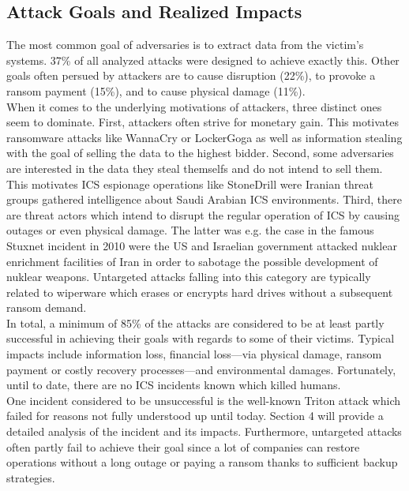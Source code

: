 \documentclass[runningheads]{llncs}
\begin{document}
\subsection{Attack Goals and Realized Impacts}
The most common goal of adversaries is to extract data from the victim's systems. 37\% of all analyzed attacks were designed to achieve exactly this.
Other goals often persued by attackers are to cause disruption (22\%), to provoke a ransom payment (15\%), and to cause physical damage (11\%).\\
When it comes to the underlying motivations of attackers, three distinct ones seem to dominate.
First, attackers often strive for monetary gain.
This motivates ransomware attacks like WannaCry or LockerGoga as well as information stealing with the goal of selling the data to the highest bidder.
Second, some adversaries are interested in the data they steal themselfs and do not intend to sell them.
This motivates ICS espionage operations like StoneDrill were Iranian threat groups gathered intelligence about Saudi Arabian ICS environments.
Third, there are threat actors which intend to disrupt the regular operation of ICS by causing outages or even physical damage.
The latter was e.g. the case in the famous Stuxnet incident in 2010 were the US and Israelian government attacked nuklear enrichment facilities of Iran in order to sabotage the possible development of nuklear weapons.
Untargeted attacks falling into this category are typically related to wiperware which erases or encrypts hard drives without a subsequent ransom demand.\\
In total, a minimum of 85\% of the attacks are considered to be at least partly successful in achieving their goals with regards to some of their victims.
Typical impacts include information loss, financial loss---via physical damage, ransom payment or costly recovery processes---and environmental damages.
Fortunately, until to date, there are no ICS incidents known which killed humans.\\
One incident considered to be unsuccessful is the well-known Triton attack which failed for reasons not fully understood up until today.
Section 4 will provide a detailed analysis of the incident and its impacts.
Furthermore, untargeted attacks often partly fail to achieve their goal since a lot of companies can restore operations without a long outage or paying a ransom thanks to sufficient backup strategies.
\end{document}
